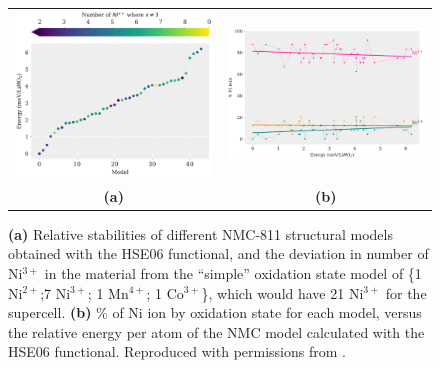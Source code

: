 \documentclass[aps,prb,twocolumn,superscriptaddress,reprint]{revtex4-1}
\begin{document}
\begin{figure}[tb]
  \begin{center}
  \begin{tabular}{c c}
  \includegraphics[width=0.46\columnwidth]{Figures/HSE_energy_cmap.pdf}&\includegraphics[width=0.46\columnwidth]{Figures/Ni_ox_vs_E.pdf}\\
  \textbf{(a)}&\textbf{(b)}\\
   \end{tabular}
    \caption{\label{fig:stability} \textbf{(a)} Relative stabilities of different NMC-811 structural models obtained with the HSE06 functional, and the deviation in number of Ni$^{3+}$ in the material from the ``simple'' oxidation state model of \{1 Ni$^{2+}$;7 Ni$^{3+}$; 1 Mn$^{4+}$; 1 Co$^{3+}$\}, which would have 21 Ni$^{3+}$ for the supercell. \textbf{(b)} \% of Ni ion by oxidation state for each model, versus the relative energy per atom of the NMC model calculated with the HSE06 functional. Reproduced with permissions from . }
    \end{center}
\end{figure}
\end{document}
